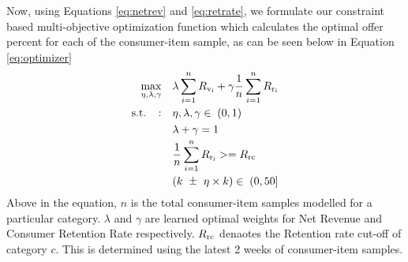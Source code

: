 Now, using Equations \ref{eq:netrev} and \ref{eq:retrate}, we formulate our constraint based 
multi-objective optimization function which calculates the optimal offer percent for each of the 
consumer-item sample, as can be seen below in Equation \ref{eq:optimizer}
\begin{equation}
\begin{aligned}
\max_{\eta, \lambda, \gamma} \quad & 
\lambda \sum_{i=1}^{n} R\textsubscript{v\textsubscript{i}} + \gamma \frac{1}{n} \sum_{i=1}^{n} R\textsubscript{r\textsubscript{i}} \\
\textrm{s.t.} \;\;\;: \quad & \eta, \lambda, \gamma \in \; (0,1) \\
& \lambda + \gamma = 1 \\
& \frac{1}{n} \sum_{i=1}^{n} R\textsubscript{r\textsubscript{i}} >= R\textsubscript{rc} \\
& (k \mypm \eta\times k) \in \; (0,50]
\end{aligned}
\label{eq:optimizer}
\end{equation}
Above in the equation, $n$ is the total consumer-item samples modelled for a particular category.
$\lambda$ and $\gamma$ are learned optimal weights for Net Revenue and Consumer Retention Rate respectively.
$R\textsubscript{rc}$ denaotes the Retention rate cut-off of category $c$. This is determined using the latest
2 weeks of consumer-item samples.